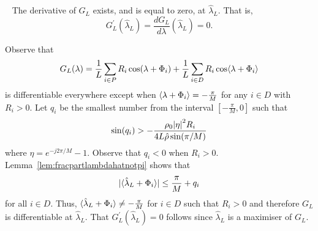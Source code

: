 \documentclass[draftcls, onecolumn, 11pt]{IEEEtran}
\begin{document}



\begin{lemma}~\label{lem:diffatlambdaL}
The derivative of $G_L$ exists, and is equal to zero, at $\hat{\lambda}_L$.  That is,
\[
G_L^\prime(\hat{\lambda}_L) = \frac{d G_L}{d \lambda}(\hat{\lambda}_L) = 0.
\]
\end{lemma}
\begin{IEEEproof}
Observe that 
\[
G_L(\lambda) = \frac{1}{L}\sum_{i \in P} R_i \cos(\lambda + \Phi_i) + \frac{1}{L} \sum_{i \in D} R_i \cos\langle \lambda + \Phi_i \rangle
\] 
is differentiable everywhere except when $\left\langle \lambda + \Phi_i \right\rangle = -\tfrac{\pi}{M}$ for any $i \in D$ with $R_i > 0$.  Let $q_i$ be the smallest number from the interval $[-\tfrac{\pi}{M}, 0]$ such that
\[
 \sin(q_i) > -\frac{\rho_0 {\vert \eta \vert}^2 R_i}{4 L \hat{\rho} \sin(\pi/M)}
\]
where $\eta = e^{-j2\pi/M} - 1$.  Observe that $q_i < 0$ when $R_i > 0$.  Lemma~\ref{lem:fracpartlambdahatnotpi} shows that
\[
{\vert \langle \hat{\lambda}_L + \Phi_i \rangle \vert} \leq \frac{\pi}{M} + q_i
\]
for all $i \in D$.  Thus, $\langle \hat{\lambda}_L + \Phi_i \rangle \neq -\tfrac{\pi}{M}$ for $i \in D$ such that $R_i > 0$ and therefore $G_L$ is differentiable at $\hat{\lambda}_L$.  That $G_L^\prime(\hat{\lambda}_L) = 0$ follows since $\hat{\lambda}_L$ is a maximiser of $G_L$.
\end{IEEEproof}
\end{document}
